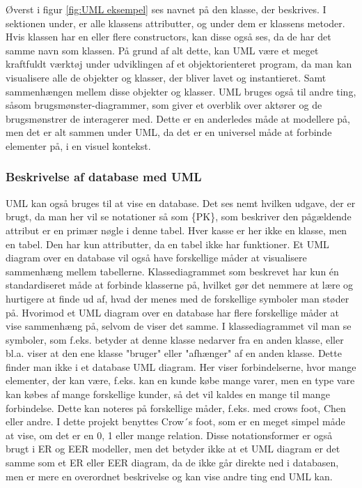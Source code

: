 Øverst i figur \ref{fig:UML eksempel} ses navnet på den klasse, der beskrives. I sektionen under, er alle klassens attributter, og under dem er klassens metoder. Hvis klassen har en eller flere constructors, kan disse også ses, da de har det samme navn som klassen. På grund af alt dette, kan UML være et meget kraftfuldt værktøj under udviklingen af et objektorienteret program, da man kan visualisere alle de objekter og klasser, der bliver lavet og instantieret. Samt sammenhængen mellem disse objekter og klasser. UML bruges også til andre ting, såsom brugsmønster-diagrammer, som giver et overblik over aktører og de brugsmønstrer de interagerer med. Dette er en anderledes måde at modellere på, men det er alt sammen under UML, da det er en universel måde at forbinde elementer på, i en visuel kontekst.


\subsubsection{Beskrivelse af database med UML}
UML kan også bruges til at vise en database. Det ses nemt hvilken udgave, der er brugt, da man her vil se notationer så som \{PK\}, som beskriver den pågældende attribut er en primær nøgle i denne tabel. Hver kasse er her ikke en klasse, men en tabel. Den har kun attributter, da en tabel ikke har funktioner. Et UML diagram over en database vil også have forskellige måder at visualisere sammenhæng mellem tabellerne.
Klassediagrammet som beskrevet har kun én standardiseret måde at forbinde klasserne på, hvilket gør det nemmere at lære og hurtigere at finde ud af, hvad der menes med de forskellige symboler man støder på. Hvorimod et UML diagram over en database har flere forskellige måder at vise sammenhæng på, selvom de viser det samme. I klassediagrammet vil man se symboler, som f.eks. betyder at denne klasse nedarver fra en anden klasse, eller bl.a. viser at den ene klasse "bruger" eller "afhænger" af en anden klasse. Dette finder man ikke i et database UML diagram. Her viser forbindelserne, hvor mange elementer, der kan være, f.eks. kan en kunde købe mange varer, men en type vare kan købes af mange forskellige kunder, så det vil kaldes en mange til mange forbindelse. Dette kan noteres på forskellige måder, f.eks. med crows foot, Chen eller andre. I dette projekt benyttes Crow´s foot, som er en meget simpel måde at vise, om det er en 0, 1 eller mange relation. Disse notationsformer er også brugt i ER og EER modeller, men det betyder ikke at et UML diagram er det samme som et ER eller EER diagram, da de ikke går direkte ned i databasen, men er mere en overordnet beskrivelse og kan vise andre ting end UML kan.

